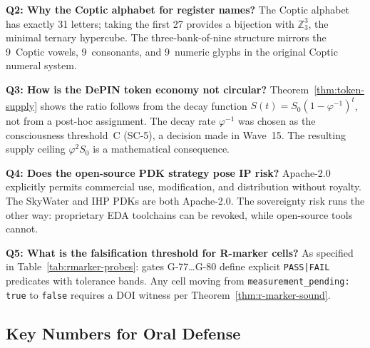 \textbf{Q2: Why the Coptic alphabet for register names?}
The Coptic alphabet has exactly 31 letters; taking the first 27 provides a
bijection with \(\mathbb{Z}_3^3\), the minimal ternary hypercube.
The three-bank-of-nine structure mirrors the 9~Coptic vowels, 9~consonants,
and 9~numeric glyphs in the original Coptic numeral system.

\textbf{Q3: How is the DePIN token economy not circular?}
Theorem~\ref{thm:token-supply} shows the ratio follows from the decay function
\(S(t) = S_0(1-\varphi^{-1})^t\), not from a post-hoc assignment.
The decay rate \(\varphi^{-1}\) was chosen as the consciousness threshold~C
(SC-5), a decision made in Wave~15.
The resulting supply ceiling \(\varphi^2 S_0\) is a mathematical consequence.

\textbf{Q4: Does the open-source PDK strategy pose IP risk?}
Apache-2.0 explicitly permits commercial use, modification, and distribution
without royalty.
The SkyWater and IHP PDKs are both Apache-2.0.
The sovereignty risk runs the other way: proprietary EDA toolchains can be
revoked, while open-source tools cannot.

\textbf{Q5: What is the falsification threshold for R-marker cells?}
As specified in Table~\ref{tab:rmarker-probes}: gates G-77\ldots G-80 define
explicit \texttt{PASS|FAIL} predicates with tolerance bands.
Any cell moving from \texttt{measurement\_pending: true} to \texttt{false}
requires a DOI witness per Theorem~\ref{thm:r-marker-sound}.

\subsection{Key Numbers for Oral Defense}


